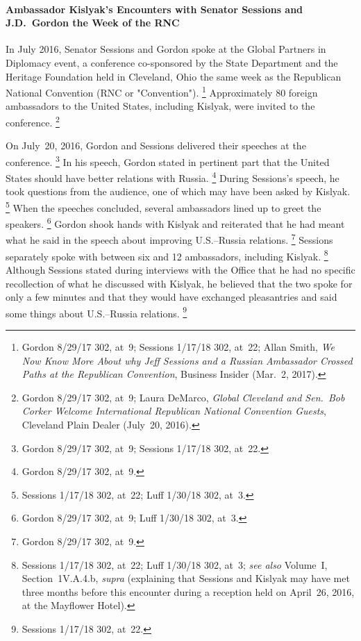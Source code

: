 \paragraph{Ambassador Kislyak's Encounters with Senator Sessions and J.D.~Gordon the Week of the RNC}

In July 2016, Senator Sessions and Gordon spoke at the Global Partners in Diplomacy event, a conference co-sponsored by the State Department and the Heritage Foundation held in Cleveland, Ohio the same week as the Republican National Convention (RNC or "Convention").%
\footnote{Gordon 8/29/17 302, at~9;
Sessions 1/17/18 302, at~22;
Allan Smith, \textit{We Now Know More About why Jeff Sessions and a Russian Ambassador Crossed Paths at the Republican Convention}, Business Insider (Mar.~2, 2017).}
Approximately 80 foreign ambassadors to the United States, including Kislyak, were invited to the conference.%
\footnote{Gordon 8/29/17 302, at~9;
Laura DeMarco, \textit{Global Cleveland and Sen.~Bob Corker Welcome International Republican National Convention Guests}, Cleveland Plain Dealer (July~20, 2016).
}

On July~20, 2016, Gordon and Sessions delivered their speeches at the conference.%
\footnote{Gordon 8/29/17 302, at~9;
Sessions 1/17/18 302, at~22.}
In his speech, Gordon stated in pertinent part that the United States should have better relations with Russia.%
\footnote{Gordon 8/29/17 302, at~9.}
During Sessions's speech, he took questions from the audience, one of which may have been asked by Kislyak.%
\footnote{Sessions 1/17/18 302, at~22;
Luff 1/30/18 302, at~3.}
When the speeches concluded, several ambassadors lined up to greet the speakers.%
\footnote{Gordon 8/29/17 302, at~9;
Luff 1/30/18 302, at~3.}
Gordon shook hands with Kislyak and reiterated that he had meant what he said in the speech about improving U.S.--Russia relations.%
\footnote{Gordon 8/29/17 302, at~9.}
Sessions separately spoke with between six and 12 ambassadors, including Kislyak.%
\footnote{Sessions 1/17/18 302, at~22; Luff 1/30/18 302, at~3;
\textit{see also} Volume~I, Section~1V.A.4.b, \textit{supra} (explaining that Sessions and Kislyak may have met three months before this encounter during a reception held on April~26, 2016, at the Mayflower Hotel).}
Although Sessions stated during interviews with the Office that he had no specific recollection of what he discussed with Kislyak, he believed that the two spoke for only a few minutes and that they would have exchanged pleasantries and said some things about U.S.--Russia relations.%
\footnote{Sessions 1/17/18 302, at~22.}

